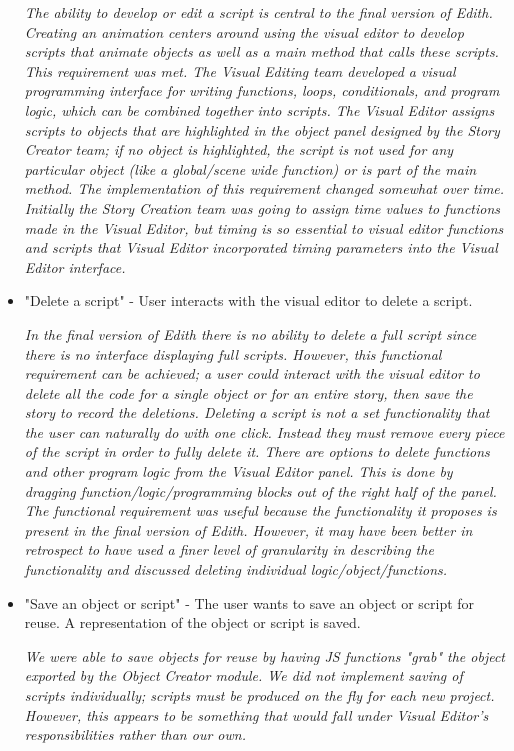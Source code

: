 \documentclass[12pt]{article}
\begin{document}
\begin{itemize}
\textit{The ability to develop or edit a script is central to the final version of Edith. Creating an animation centers around using the visual editor to develop scripts that animate objects as well as a main method that calls these scripts. This requirement was met. The Visual Editing team developed a visual programming interface for writing functions, loops, conditionals, and program logic, which can be combined together into scripts. The Visual Editor assigns scripts to objects that are highlighted in the object panel designed by the Story Creator team; if no object is highlighted, the script is not used for any particular object (like a global/scene wide function) or is part of the main method. The implementation of this requirement changed somewhat over time. Initially the Story Creation team was going to assign time values to functions made in the Visual Editor, but timing is so essential to visual editor functions and scripts that Visual Editor incorporated timing parameters into the Visual Editor interface.}

\item "Delete a script" - User interacts with the visual editor to delete a script.\ 

\textit{In the final version of Edith there is no ability to delete a full script since there is no interface displaying full scripts. However, this functional requirement can be achieved; a user could interact with the visual editor to delete all the code for a single object or for an entire story, then save the story to record the deletions.  Deleting a script is not a set functionality that the user can naturally do with one click.  Instead they must remove every piece of the script in order to fully delete it. There are options to delete functions and other program logic from the Visual Editor panel. This is done by dragging function/logic/programming blocks out of the right half of the panel. The functional requirement was useful because the functionality it proposes is present in the final version of Edith. However, it may have been better in retrospect to have used a finer level of granularity in describing the functionality and discussed deleting individual logic/object/functions.}

\item "Save an object or script" - The user wants to save an object or script for reuse. A representation of the object or script is saved.\

\textit{We were able to save objects for reuse by having JS functions "grab" the object exported by the Object Creator module. We did not implement saving of scripts individually; scripts must be produced on the fly for each new project. However, this appears to be something that would fall under Visual Editor's responsibilities rather than our own.}


\end{itemize}
\end{document}
